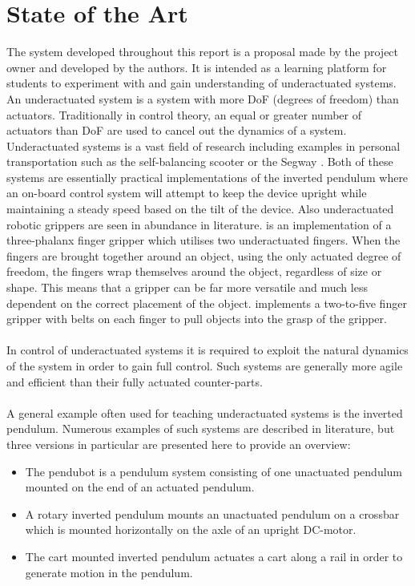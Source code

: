 \section{State of the Art}
The system developed throughout this report is a proposal made by the project owner and developed by the authors.
It is intended as a learning platform for students to experiment with and gain understanding of underactuated systems.
An underactuated system is a system with more DoF (degrees of freedom) than actuators.
Traditionally in control theory, an equal or greater number of actuators than DoF are used to cancel out the dynamics of a system.
Underactuated systems is a vast field of research including examples in personal transportation such as the self-balancing scooter \cite{scooter} or the Segway \cite{segway}.
Both of these systems are essentially practical implementations of the inverted pendulum where an on-board control system will attempt to keep the device upright while maintaining a steady speed based on the tilt of the device.
Also underactuated robotic grippers are seen in abundance in literature. 
\cite{threegripper} is an implementation of a three-phalanx finger gripper which utilises two underactuated fingers.
When the fingers are brought together around an object, using the only actuated degree of freedom, the fingers wrap themselves around the object, regardless of size or shape.
This means that a gripper can be far more versatile and much less dependent on the correct placement of the object. 
\cite{pullgripper} implements a two-to-five finger gripper with belts on each finger to pull objects into the grasp of the gripper.
\\~\\
In control of underactuated systems it is required to exploit the natural dynamics of the system \cite{mitunderactuated} in order to gain full control.
Such systems are generally more agile and efficient than their fully actuated counter-parts.
\\~\\
A general example often used for teaching underactuated systems is the inverted pendulum.
Numerous examples of such systems are described in literature, but three versions in particular are presented here to provide an overview:
\begin{itemize}
	\item The pendubot \cite{pendubot} is a pendulum system consisting of one unactuated pendulum mounted on the end of an actuated pendulum.
	\item A rotary inverted pendulum \cite{rotarypendulum} mounts an unactuated pendulum on a crossbar which is mounted horizontally on the axle of an upright DC-motor.
	\item The cart mounted inverted pendulum \cite{invertpendulum3} actuates a cart along a rail in order to generate motion in the pendulum.
\end{itemize} 
